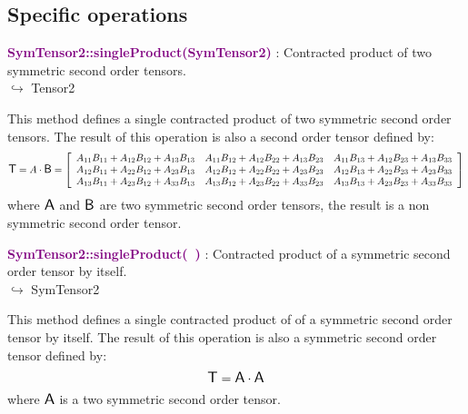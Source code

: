 \subsection{Specific operations}

\textcolor{purple}{\textbf{SymTensor2::singleProduct(SymTensor2)}}\label{SymTensor2::singleProduct(SymTensor2)} : Contracted product of two symmetric second order tensors.\\ \hspace*{5mm}$\hookrightarrow$ Tensor2

This method defines a single contracted product of two symmetric second order tensors.
The result of this operation is also a second order tensor defined by:
\begin{equation*}
\mbox{\large\ensuremath{\mathsf{T}}}=A \cdot \mbox{\large\ensuremath{\mathsf{B}}}=\left[\begin{array}{ccc}
A_{11} B_{11} + A_{12} B_{12} + A_{13} B_{13} & A_{11} B_{12} + A_{12} B_{22} + A_{13} B_{23} & A_{11} B_{13} + A_{12} B_{23} + A_{13} B_{33} \\
A_{12} B_{11} + A_{22} B_{12} + A_{23} B_{13} & A_{12} B_{12} + A_{22} B_{22} + A_{23} B_{23} & A_{12} B_{13} + A_{22} B_{23} + A_{23} B_{33} \\
A_{13} B_{11} + A_{23} B_{12} + A_{33} B_{13} & A_{13} B_{12} + A_{23} B_{22} + A_{33} B_{23} & A_{13} B_{13} + A_{23} B_{23} + A_{33} B_{33}
\end{array}\right]
\end{equation*}
where $\mbox{\large\ensuremath{\mathsf{A}}}$ and $\mbox{\large\ensuremath{\mathsf{B}}}$ are two symmetric second order tensors, the result is a non symmetric second order tensor.

\textcolor{purple}{\textbf{SymTensor2::singleProduct(~)}}\label{SymTensor2::singleProduct()} : Contracted product of a symmetric second order tensor by itself.\\ \hspace*{5mm}$\hookrightarrow$ SymTensor2

This method defines a single contracted product of of a symmetric second order tensor by itself.
The result of this operation is also a symmetric second order tensor defined by:
\begin{equation*}
\mbox{\large\ensuremath{\mathsf{T}}} = \mbox{\large\ensuremath{\mathsf{A}}} \cdot \mbox{\large\ensuremath{\mathsf{A}}}
\end{equation*}
where $\mbox{\large\ensuremath{\mathsf{A}}}$ is a two symmetric second order tensor.

